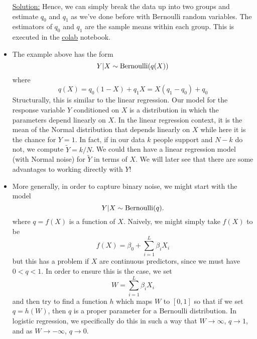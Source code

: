 \begin{itemize}
\begin{example}
\noindent
\underline{Solution:} Hence, we can simply break the data up into two groups and estimate $q_0$ and $q_1$ as we've done before with Bernoulli random variables. The estimators of $q_0$ and $q_1$ are the sample means within each group. This is executed in the \href{https://colab.research.google.com/drive/1_oMrxtIlJ-EdW1ozmlydx0A9qrA-sVKm?usp=sharing}{colab} notebook.




\end{example}
\item The example above has the form
\begin{equation*}
Y|X \sim {\rm Bernoulli}(q(X))
\end{equation*}
where 
\begin{equation*}
q(X) = q_0(1-X) + q_1X = X(q_1-q_0) + q_0
\end{equation*}
Structurally, this is similar to the linear regression.  Our model for the response variable $Y$ conditioned on $X$ is a distribution in which the parameters depend linearly on $X$.  In the linear regression context, it is the mean of the Normal distribution that depends linearly on $X$ while here it is the chance for $Y=1$.  In fact, if in our data $k$ people support and $N-k$ do not, we compute $\tilde{Y} = k/N$. We could then have a linear regression model (with Normal noise) for $\tilde{Y}$ in terms of $X$. We will later see that there are some advantages to working directly with $Y$!
\item More generally, in order to capture binary noise, we might start with the model
\begin{equation*}
Y|X \sim {\rm Bernoulli}(q).
\end{equation*}
where $q = f(X)$ is a function of $X$. Naively, we might simply take $f(X)$ to be 
\begin{equation*}
f(X) = \beta_0 +  \sum_{i=1}^L \beta_i X_i
\end{equation*}
but this has a problem if $X$ are continuous predictors, since we must have $0<q<1$. In order to ensure this is the case, we set 
\begin{equation*}
W =   \sum_{i=1}^L \beta_i X_i
\end{equation*} 
and then try to find a function $h$ which maps $W$ to $[0,1]$ so that if we set $q= h(W)$, then $q$ is a proper parameter for a Bernoulli distribution. In logistic regression, we specifically do this in such a way that $W \to \infty$, $q \to 1$, and as $W \to -\infty$, $q \to 0$. 
\end{itemize}


